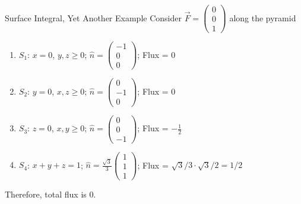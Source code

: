 \documentclass[8pt]{extarticle}
\begin{document}
  \begin{problem}{Surface Integral, Yet Another Example}
    Consider $\vec{F} = \begin{pmatrix}0\\0\\1\end{pmatrix}$ along the pyramid
    \begin{enumerate}[(1)]
      \item $S_1$: $x=0$, $y,z\geq 0$; $\hat{n} = \begin{pmatrix}-1\\0\\0\end{pmatrix}$; Flux = $0$
      \item $S_2$: $y=0$, $x,z\geq 0$; $\hat{n} = \begin{pmatrix}0\\-1\\0\end{pmatrix}$; Flux = $0$
      \item $S_3$: $z=0$, $x,y \geq 0$; $\hat{n} = \begin{pmatrix}0\\0\\-1\end{pmatrix}$; Flux = $-\frac{1}{2}$
      \item $S_4$: $x+y+z = 1$; $\hat{n} = \frac{\sqrt{3}}{3} \begin{pmatrix}1\\1\\1\end{pmatrix}$; Flux = $\sqrt{3}/3 \cdot \sqrt{3}/2 = 1/2$
    \end{enumerate}
    Therefore, total flux is $0$.
  \end{problem}
\end{document}
